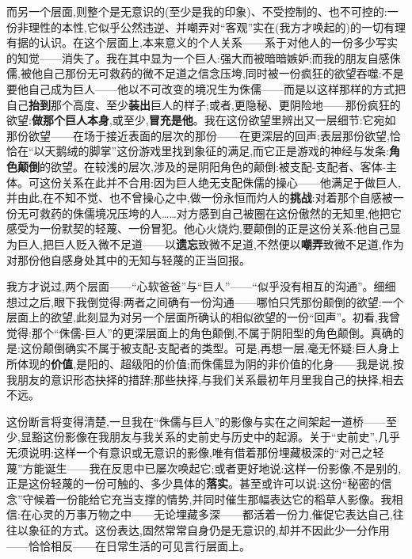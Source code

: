 而另一个层面,则整个是无意识的(至少是我的印象)、不受控制的、也不可控的:一份非理性的本性,它似乎公然违逆、并嘲弄对“客观”实在(我方才唤起的)的一切有理有据的认识。在这个层面上,本来意义的个人关系——系于对他人的一份多少写实的知觉——消失了。我在其中显为一个巨人:强大而被暗暗嫉妒;而我的朋友自感侏儒,被他自己那份无可救药的微不足道之信念压垮,同时被一份疯狂的欲望吞噬:不是要他自己成为巨人——他以不可改变的境况生为侏儒——而是以这样那样的方式把自己\textbf{抬到}那个高度、至少\textbf{装出}巨人的样子;或者,更隐秘、更阴险地——那份疯狂的欲望:\textbf{做那个巨人本身},或至少,\textbf{冒充是他}。我在这份欲望里辨出又一层细节:它宛如那份欲望——在场于接近表面的层次的那份——在更深层的回声;表层那份欲望,恰恰在“以天鹅绒的脚掌”这份游戏里找到象征的满足,而它正是游戏的神经与发条:\textbf{角色颠倒}的欲望。在较浅的层次,涉及的是阴阳角色的颠倒:被支配-支配者、客体-主体。可这份关系在此并不合用:因为巨人绝无支配侏儒的操心——他满足于做巨人,并由此,在不知不觉、也不曾操心之中,做一份永恒而灼人的\textbf{挑战}:对着那个自感被一份无可救药的侏儒境况压垮的人……对方感到自己被圈在这份傲然的无知里,他把它感受为一份默契的轻蔑、一份冒犯。他心火烧灼,要颠倒的正是这份关系:他自己显为巨人,把巨人贬入微不足道——以\textbf{遗忘}致微不足道,不然便以\textbf{嘲弄}致微不足道,作为对那份他自感身处其中的无知与轻蔑的正当回报。

我方才说过,两个层面——“心软爸爸”与“巨人”——“似乎没有相互的沟通”。细细想过之后,眼下我倒觉得:两者之间确有一份沟通——哪怕只凭那份颠倒的欲望:一个层面上的欲望,此刻显为对另一个层面所确认的相似欲望的一份“回声”。初看,我曾觉得:那个“侏儒-巨人”的更深层面上的角色颠倒,不属于阴阳型的角色颠倒。真确的是:这份颠倒确实不属于被支配-支配者的类型。可是,再想一层,毫无怀疑:巨人身上所体现的\textbf{价值},是阳的、超级阳的价值;而侏儒显为阴的非价值的化身——我是说,按我朋友的意识形态抉择的措辞;那些抉择,与我们关系最初年月里我自己的抉择,相去不远。

这份断言将变得清楚,一旦我在“侏儒与巨人”的影像与实在之间架起一道桥——至少,显豁这份影像在我朋友与我关系的史前史与历史中的起源。关于“史前史”,几乎无须说明:这样一个有意识或无意识的影像,唯有借着那份埋藏极深的“对己之轻蔑”方能诞生——我在反思中已屡次唤起它;或者更好地说:这样一份影像,不是别的,正是这份轻蔑的一份可触的、多少具体的\textbf{落实}。甚至或许可以说:这份“秘密的信念”守候着一份能给它充当支撑的情势,并同时催生那幅表达它的稻草人影像。我相信:在心灵的万事万物之中——无论埋藏多深——都活着一份力,催促它表达自己,往往以象征的方式。这份表达,固然常常自身仍是无意识的,却并不因此少一分作用——恰恰相反——在日常生活的可见言行层面上。

